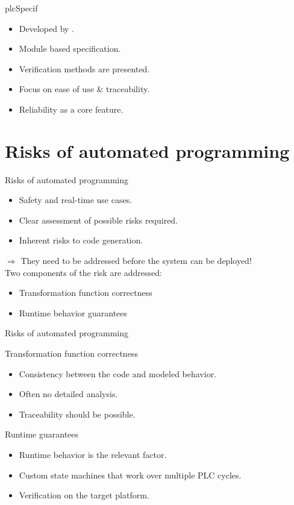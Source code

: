 \documentclass[18pt]{beamer}
\begin{document}
\begin{frame}{plcSpecif}
    \begin{itemize}
        \item Developed by \cite{7819191}.
        \item Module based specification.
        \item Verification methods are presented.
        \item Focus on ease of use \& traceability.
        \item Reliability as a core feature.
    \end{itemize}
\end{frame}

\section{Risks of automated programming}

\begin{frame}{Risks of automated programming}
\begin{itemize}
    \item Safety and real-time use cases.
    \item Clear assessment of possible risks required.
    \item Inherent risks to code generation.
\end{itemize}
$\Rightarrow$ They need to be addressed before the system can be deployed!
\pause
\\
Two components of the risk are addressed:
\begin{itemize}
    \item Transformation function correctness
    \item Runtime behavior guarantees
\end{itemize}
\end{frame}

\begin{frame}{Risks of automated programming}

\begin{block}{Transformation function correctness}
	\begin{itemize}
		\item Consistency between the code and modeled behavior.
        \item Often no detailed analysis.
        \item Traceability should be possible.
	\end{itemize}
\end{block}
\pause
\begin{block}{Runtime guarantees}
    \begin{itemize}
        \item Runtime behavior is the relevant factor.
        \item Custom state machines that work over multiple PLC cycles.
        \item Verification on the target platform.
    \end{itemize}
\end{block}
\end{frame}
\end{document}

